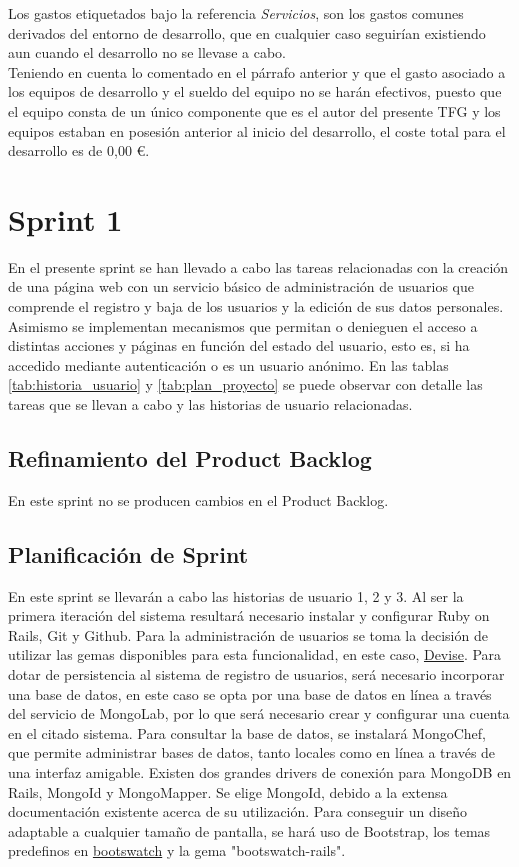 Los gastos etiquetados bajo la referencia \textit{Servicios}, son los gastos comunes derivados del entorno de desarrollo, que en cualquier caso seguirían existiendo aun cuando el desarrollo no se llevase a cabo.
\\Teniendo en cuenta lo comentado en el párrafo anterior y que el gasto asociado a los equipos de desarrollo y el sueldo del equipo no se harán efectivos, puesto que el equipo consta de un único componente que es el autor del presente \ac{TFG} y los equipos estaban en posesión anterior al inicio del desarrollo, el coste total para el desarrollo es de 0,00 \euro.


\section{Sprint 1}
En el presente sprint se han llevado a cabo las tareas relacionadas con la creación de una página web con un servicio básico de administración de usuarios que comprende el registro y baja de los usuarios y la edición de sus datos personales. Asimismo se implementan mecanismos que permitan o denieguen el acceso a distintas acciones y páginas en función del estado del usuario, esto es, si ha accedido mediante autenticación o es un usuario anónimo. En las tablas \ref{tab:historia_usuario} y \ref{tab:plan_proyecto} se puede observar con detalle las tareas que se llevan a cabo y las historias de usuario relacionadas.

	\subsection{Refinamiento del Product Backlog}
	En este sprint no se producen cambios en el Product Backlog.
	
	\subsection{Planificación de Sprint}
	En este sprint se llevarán a cabo las historias de usuario 1, 2 y 3. Al ser la primera iteración del sistema resultará necesario instalar y configurar Ruby on Rails, Git y Github. Para la administración de usuarios se toma la decisión de utilizar las gemas disponibles para esta funcionalidad, en este caso, \href{https://github.com/plataformatec/devise}{Devise}. Para dotar de persistencia al sistema de registro de usuarios, será necesario incorporar una base de datos, en este caso se opta por una base de datos en línea a través del servicio de MongoLab, por lo que será necesario crear y configurar una cuenta en el citado sistema. Para consultar la base de datos, se instalará MongoChef, que permite administrar bases de datos, tanto locales como en línea a través de una interfaz amigable. Existen dos grandes drivers de conexión para MongoDB en Rails, MongoId y MongoMapper. Se elige MongoId, debido a la extensa documentación existente acerca de su utilización. Para conseguir un diseño adaptable a cualquier tamaño de pantalla, se hará uso de Bootstrap, los temas predefinos en \href{https://bootswatch.com/}{bootswatch} y la gema "bootswatch-rails".
	
